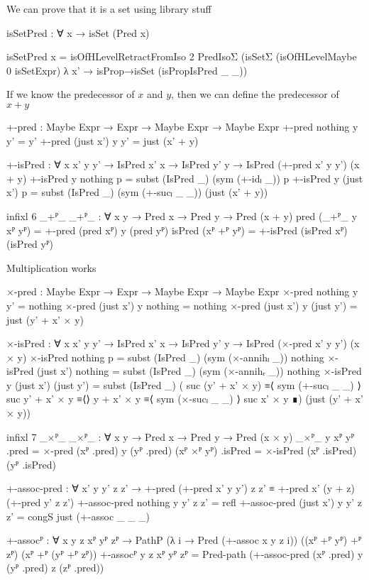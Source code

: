 We can prove that it is a set using library stuff
\begin{code}
  isSetPred : ∀ x → isSet (Pred x)
\end{code}
\begin{code}[hide]
  isSetPred x =
    isOfHLevelRetractFromIso 2 PredIsoΣ
      (isSetΣ (isOfHLevelMaybe 0 isSetExpr) λ x' →
        isProp→isSet (isPropIsPred _ _))
\end{code}
If we know the predecessor of $x$ and $y$, then we can define the predecessor of
$x + y$
\begin{code}
  +-pred : Maybe Expr → Expr → Maybe Expr → Maybe Expr
  +-pred nothing y y' = y'
  +-pred (just x') y y' = just (x' + y)

  +-isPred :
    ∀ {x x' y y'} →
    IsPred x' x → IsPred y' y → IsPred (+-pred x' y y') (x + y)
  +-isPred {y} nothing p = subst (IsPred _) (sym (+-idₗ _)) p
  +-isPred {y} (just x') p =
    subst (IsPred _) (sym (+-sucₗ _ _)) (just (x' + y))

  infixl 6 _+ᴾ_
  _+ᴾ_ : ∀ {x y} → Pred x → Pred y → Pred (x + y)
  pred (_+ᴾ_ {y} xᴾ yᴾ) = +-pred (pred xᴾ) y (pred yᴾ)
  isPred (xᴾ +ᴾ yᴾ) = +-isPred (isPred xᴾ) (isPred yᴾ)
\end{code}
Multiplication works
\begin{code}
  ×-pred : Maybe Expr → Expr → Maybe Expr → Maybe Expr
  ×-pred nothing y y' = nothing
  ×-pred (just x') y nothing = nothing
  ×-pred (just x') y (just y') = just (y' + x' × y)
\end{code}
\begin{code}[hide]
  ×-isPred :
    ∀ {x x' y y'} →
    IsPred x' x → IsPred y' y → IsPred (×-pred x' y y') (x × y)
  ×-isPred nothing p = subst (IsPred _) (sym (×-annihₗ _)) nothing
  ×-isPred (just x') nothing = subst (IsPred _) (sym (×-annihᵣ _)) nothing
  ×-isPred {y} (just x') (just y') =
    subst (IsPred _)
      ( suc (y' + x' × y) ≡⟨ sym (+-sucₗ _ _) ⟩
        suc y' + x' × y   ≡⟨⟩
        y + x' × y         ≡⟨ sym (×-sucₗ _ _) ⟩
        suc x' × y         ∎)
      (just (y' + x' × y))

  infixl 7 _×ᴾ_
  _×ᴾ_ : ∀ {x y} → Pred x → Pred y → Pred (x × y)
  _×ᴾ_ {y} xᴾ yᴾ .pred = ×-pred (xᴾ .pred) y (yᴾ .pred)
  (xᴾ ×ᴾ yᴾ) .isPred = ×-isPred (xᴾ .isPred) (yᴾ .isPred)

  +-assoc-pred :
    ∀ x' y y' z z' →
    +-pred (+-pred x' y y') z z' ≡ +-pred x' (y + z) (+-pred y' z z')
  +-assoc-pred nothing y y' z z' = refl
  +-assoc-pred (just x') y y' z z' = congS just (+-assoc _ _ _)

  +-assocᴾ :
    ∀ {x y z} xᴾ yᴾ zᴾ →
    PathP (λ i → Pred (+-assoc x y z i)) ((xᴾ +ᴾ yᴾ) +ᴾ zᴾ) (xᴾ +ᴾ (yᴾ +ᴾ zᴾ))
  +-assocᴾ {y} {z} xᴾ yᴾ zᴾ =
    Pred-path (+-assoc-pred (xᴾ .pred) y (yᴾ .pred) z (zᴾ .pred))
\end{code}
